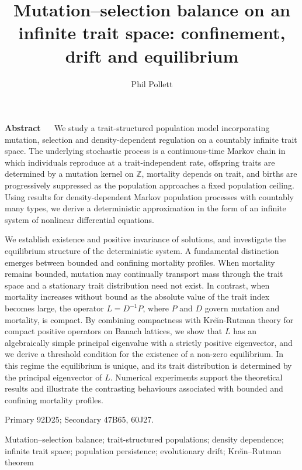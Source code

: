 \documentclass[12pt]{article}
\title{Mutation--selection balance on an infinite trait space: 
confinement, drift and equilibrium}
\author{Phil Pollett}
\newcommand{\Z}{\ensuremath{\mathbb Z}}
\begin{document}
\maketitle

\begin{center}
\begin{minipage}{14cm}
{\bf Abstract} \ \ 
\setlength{\parindent}{1.5em}
We study a trait-structured population model incorporating mutation,
selection and density-dependent regulation on a countably infinite trait
space. The underlying stochastic process is a continuous-time
Markov chain in which individuals reproduce at a
trait-independent rate, offspring traits are determined by a mutation
kernel on $\Z$, mortality depends on trait, and births are
progressively suppressed as the population approaches a fixed population
ceiling. Using results for density-dependent Markov population processes
with countably many types, we derive a deterministic approximation in
the form of an infinite system of nonlinear differential equations.

We establish existence and positive invariance of solutions, and
investigate the equilibrium structure of the deterministic system. A
fundamental distinction emerges between bounded and confining mortality
profiles. When mortality remains bounded, mutation may continually
transport mass through the trait space and a stationary trait distribution
need not exist. In contrast, when mortality increases without bound as the
absolute value of the trait index becomes large, the operator
$L=D^{-1}P$, where $P$ and $D$ govern mutation and mortality, is
compact. By combining compactness with Kre\u{\i}n-Rutman theory for
compact positive operators on Banach lattices, we show that $L$ has an
algebraically simple principal eigenvalue with a strictly positive
eigenvector, and we derive a threshold condition for the existence of a
non-zero equilibrium. In this regime the equilibrium is unique, and its
trait distribution is determined by the principal eigenvector of $L$.
Numerical experiments support the theoretical results and illustrate the
contrasting behaviours associated with bounded and confining mortality
profiles.
\end{minipage}
\end{center}

\smallskip
{} Primary 92D25; 
Secondary 47B65, 60J27.

\medskip
{} 
Mutation--selection balance; 
trait-structured populations; 
density dependence; 
infinite trait space; 
population persistence; 
evolutionary drift; 
Kre\u{\i}n--Rutman theorem
\end{document}
